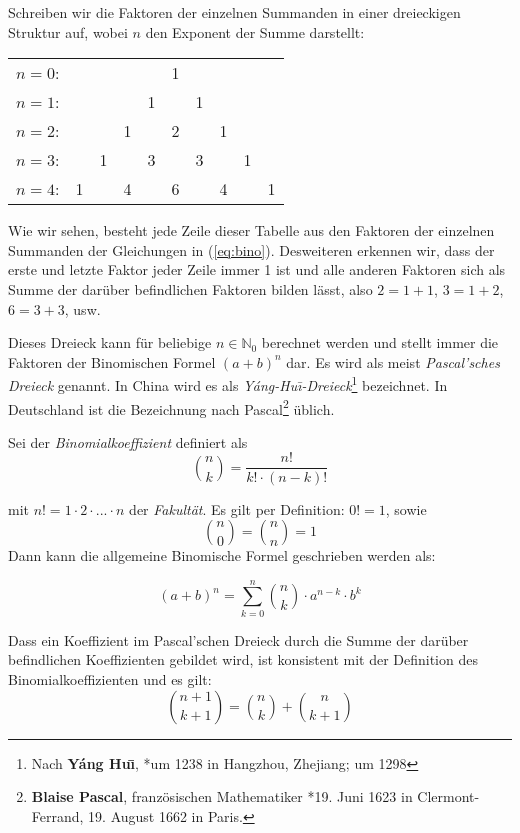 \begin{definition}
Schreiben wir die Faktoren der einzelnen Summanden in einer dreieckigen Struktur auf, wobei $n$ den Exponent der Summe darstellt:

\begin{center}
\begin{tabular}{rccccccccc} 
$n=0$:& & & & & 1\\
\noalign{\smallskip} $n=1$:& & & & 1 & & 1\\
\noalign{\smallskip} $n=2$:& & & 1 & & 2 & & 1\\
\noalign{\smallskip} $n=3$:& & 1 & & 3 & & 3 & & 1\\
\noalign{\smallskip} $n=4$:& 1 & & 4 & & 6 & & 4 & & 1
\end{tabular}
\end{center}
Wie wir sehen, besteht jede Zeile dieser Tabelle aus den Faktoren der einzelnen Summanden der Gleichungen in (\ref{eq:bino}). Desweiteren erkennen wir, dass der erste und letzte Faktor jeder Zeile immer 1 ist und alle anderen Faktoren sich als Summe der darüber befindlichen Faktoren bilden lässt, also $2=1+1$, $3=1+2$, $6=3+3$, usw.
\end{definition}

Dieses Dreieck kann für beliebige $n\in \mathbb{N}_0$ berechnet werden und stellt immer die Faktoren der Binomischen Formel $(a+b)^n$ dar. Es wird als meist \textsl{Pascal'sches Dreieck} genannt. In China wird es als \textsl{Yáng-Hu\=\i-Dreieck}\footnote{Nach \textbf{Yáng Hu\=\i}, *um 1238 in Hangzhou, Zhejiang;  um 1298} bezeichnet. In Deutschland ist die Bezeichnung nach Pascal\footnote{\textbf{Blaise Pascal}, französischen Mathematiker *19. Juni 1623 in Clermont-Ferrand, 19. August 1662 in Paris.} üblich.

\begin{definition}
Sei der \textsl{Binomialkoeffizient} definiert als 
\[
	\binom{n}{k} = \frac{n!}{k!\cdot (n-k)!}
\]
\end{definition}
mit $n! = 1\cdot 2\cdot ... \cdot n$ der \textsl{Fakultät}. Es gilt per Definition: $0!=1$, sowie
\[
\binom{n}{0} = \binom{n}{n} = 1
\]
Dann kann die allgemeine Binomische Formel geschrieben werden als:

\begin{equation}
(a+b)^n = \sum_{k=0}^{n} \binom{n}{k} \cdot a^{n-k}\cdot b^k
\end{equation}

\begin{claim}
Dass ein Koeffizient im Pascal'schen Dreieck durch die Summe der darüber befindlichen Koeffizienten gebildet wird, ist konsistent mit der Definition des Binomialkoeffizienten und es gilt:
\[
\binom{n+1}{k+1} = \binom{n}{k} + \binom{n}{k+1}
\]
\end{claim}

